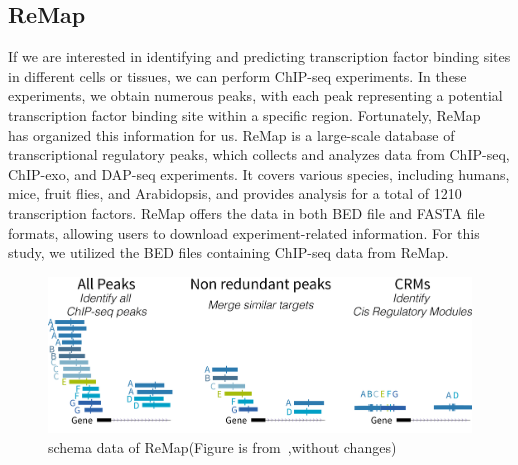 \documentclass{PHlab-thesis}
\begin{document}
\subsection{ReMap}
If we are interested in identifying and predicting transcription factor binding sites in different cells or tissues, we can perform ChIP-seq experiments. In these experiments, we obtain numerous peaks, with each peak representing a potential transcription factor binding site within a specific region. Fortunately, ReMap~\cite{ReMapFayrouz2022} has organized this information for us. ReMap is a large-scale database of transcriptional regulatory peaks, which collects and analyzes data from ChIP-seq, ChIP-exo, and DAP-seq experiments. It covers various species, including humans, mice, fruit flies, and Arabidopsis, and provides analysis for a total of 1210 transcription factors. ReMap offers the data in both BED file and FASTA file formats, allowing users to download experiment-related information. For this study, we utilized the BED files containing ChIP-seq data from ReMap.

\begin{figure}[H]
	\centering
	\includegraphics[scale=0.5]{figures/schema_data_remap2020_2.png}
	\caption{schema data of ReMap(Figure is from~\cite{ReMapFayrouz2022},without changes)}
	\label{fig:remap} %
\end{figure}
\end{document}
